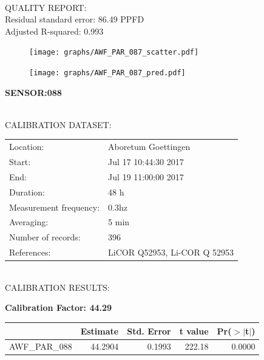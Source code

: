 \documentclass[oneside]{report}
\begin{document}
\hrulefill\\
QUALITY REPORT:\\
Residual standard error: 86.49 PPFD\\
Adjusted R-squared: 0.993



\begin{figure}[H]
  \centering
  \texttt{[image: graphs/AWF\_PAR\_087\_scatter.pdf]}
\end{figure}




\begin{figure}[H]
  \centering
  \texttt{[image: graphs/AWF\_PAR\_087\_pred.pdf]}
\end{figure}

\pagebreak


\begin{center}
\large{\textbf{SENSOR:088}}\\
\end{center}

\hrulefill\\
CALIBRATION DATASET:\\
\begin{table}[h!]
  \centering
  \label{tab:table1}
  \begin{tabular}{ll}
    Location: & Aboretum Goettingen\\ 
    
    
    Start:  & Jul 17 10:44:30 2017 \\
    End:   & Jul 19 11:00:00 2017\\ 
    Duration: & 48 h\\
    Measurement frequency: & 0.3hz\\
    Averaging:  &5 min\\
    Number of records: & 396 \\
    References: & LiCOR Q52953, Li-COR Q 52953 \\
  \end{tabular}
\end{table}

\hrulefill\\
CALIBRATION RESULTS:\\


\begin{center}
\textbf{\large{Calibration Factor: 44.29}}\\
\end{center}
\begin{table}[ht]
\centering
\begin{tabular}{rrrrr}
  \hline
 & Estimate & Std. Error & t value & Pr($>$$|$t$|$) \\ 
  \hline
AWF\_PAR\_088 & 44.2904 & 0.1993 & 222.18 & 0.0000 \\ 
   \hline
\end{tabular}
\end{table}
\end{document}
